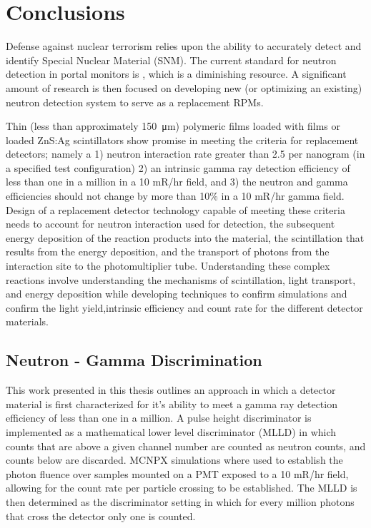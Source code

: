 \chapter{Conclusions}
\label{chap:Conclusions}
Defense against nuclear terrorism relies upon the ability to accurately detect and identify Special Nuclear Material (SNM).
The current standard for neutron detection in portal monitors is , which is a diminishing resource. 
A significant amount of research is then focused on developing new (or optimizing an existing) neutron detection system to serve as a replacement RPMs.

Thin (less than approximately \SI{150}{\um}) polymeric films loaded with  films or  loaded ZnS:Ag scintillators show promise in meeting the criteria for replacement detectors; namely a 1) neutron interaction rate greater than 2.5 per nanogram  (in a specified test configuration) 2) an intrinsic gamma ray detection efficiency of less than one in a million in a 10 mR/hr field, and 3) the neutron and gamma efficiencies should not change by more than 10\% in a 10 mR/hr gamma field.
Design of a replacement detector technology capable of meeting these criteria needs to account for neutron interaction used for detection, the subsequent energy deposition  of the reaction products into the material, the scintillation that results from the energy deposition, and the transport of photons from the interaction site to the photomultiplier tube.
Understanding these complex reactions involve understanding the mechanisms of scintillation, light transport, and energy deposition while developing techniques to confirm simulations and confirm the light yield,intrinsic efficiency and count rate for the different detector materials.

\section{Neutron - Gamma Discrimination}
This work presented in this thesis outlines an approach in which a detector material is first characterized for it's ability to meet a gamma ray detection efficiency of less than one in a million. 
A pulse height discriminator is implemented as a mathematical lower level discriminator (MLLD) in which counts that are above a given channel number are counted as neutron counts, and counts below are discarded.
MCNPX simulations where used to establish the photon fluence over samples mounted on a PMT exposed to a 10 mR/hr field, allowing for the count rate per particle crossing to be established.
The MLLD is then determined as the discriminator setting in which for every million photons that cross the detector only one is counted.


